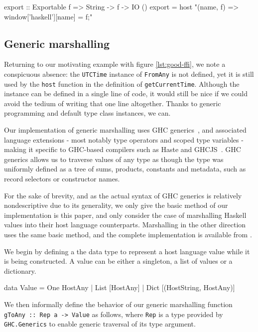\documentclass{sigplanconf}
\begin{document}
\begin{code}
  export :: Exportable f => String -> f -> IO ()
  export =
    host "(name, f) => {window['haskell'][name] = f;}"
\end{code}

\subsection{Generic marshalling}
\label{sec:default-instances}
Returning to our motivating example with figure \ref{lst:good-ffi}, we note
a conspicuous absence: the \lstinline!UTCTime! instance of \lstinline!FromAny!
is not defined, yet it is still used by the \lstinline!host! function in the
definition of \lstinline!getCurrentTime!. Although the instance can be defined
in a single line of code, it would still be nice if we could avoid the tedium
of writing that one line altogether. Thanks to generic programming and default
type class instances, we can.

Our implementation of generic marshalling uses GHC generics\ \cite{generics},
and associated language extensions - most notably type operators and scoped
type variables - making it specific to GHC-based compilers such as Haste and
GHCJS\ \cite{ghcjs}. GHC generics allows us to traverse values of any type
as though the type was uniformly defined as a tree of sums, products,
constants and metadata, such as record selectors or constructor names.

For the sake of brevity, and as the actual syntax of GHC generics is
relatively nondescriptive due to its generality, we only give the basic method
of our implementation is this paper, and only consider the case of marshalling
Haskell values into their host language counterparts.
Marshalling in the other direction uses the same basic method,
and the complete implementation is available from \cite{haste-lang.org}.

We begin by defining a the data type to represent a host language value while
it is being constructed. A value can be either a singleton, a list of
values or a dictionary.

\begin{code}
  data Value
    = One HostAny
    | List [HostAny]
    | Dict [(HostString, HostAny)]
\end{code}

We then informally define the behavior of our generic marshalling function
\lstinline!gToAny :: Rep a -> Value! as follows, where \lstinline!Rep! is
a type provided by \lstinline!GHC.Generics! to enable generic traversal
of its type argument.
\end{document}
